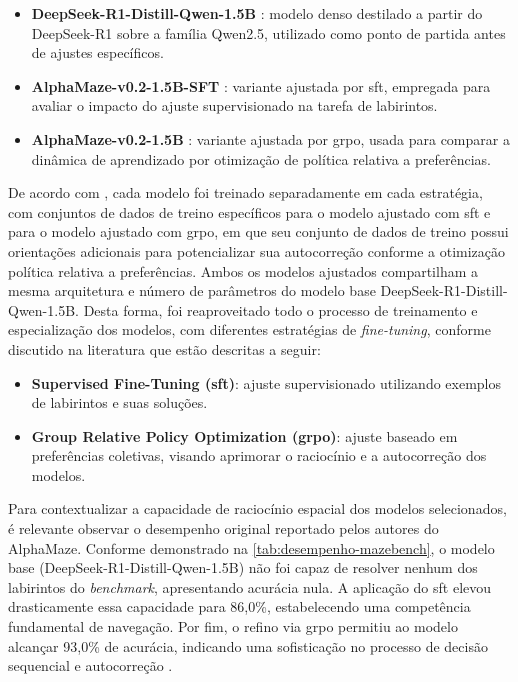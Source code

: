 \begin{itemize}
    \item \textbf{DeepSeek-R1-Distill-Qwen-1.5B} \cite{hf-deepseek-r1-dq-1p5b}: modelo denso destilado a partir do DeepSeek-R1 sobre a família Qwen2.5, utilizado como ponto de partida antes de ajustes específicos.
    \item \textbf{AlphaMaze-v0.2-1.5B-SFT} \cite{hf-jan-alpha-sft-1p5b}: variante ajustada por \gls{sft}, empregada para avaliar o impacto do ajuste supervisionado na tarefa de labirintos.
    \item \textbf{AlphaMaze-v0.2-1.5B} \cite{hf-menlo-alphamaze-v02-1p5b}: variante ajustada por \gls{grpo}, usada para comparar a dinâmica de aprendizado por otimização de política relativa a preferências.
\end{itemize}

De acordo com \citet{dao2025alphamaze}, cada modelo foi treinado separadamente em cada estratégia, com conjuntos de dados de treino específicos para o modelo ajustado com \gls{sft} e para o modelo ajustado com \gls{grpo}, em que seu conjunto de dados de treino possui orientações adicionais para potencializar sua autocorreção conforme a otimização política relativa a preferências. Ambos os modelos ajustados compartilham a mesma arquitetura e número de parâmetros do modelo base DeepSeek-R1-Distill-Qwen-1.5B. Desta forma, foi reaproveitado todo o processo de treinamento e especialização dos modelos, com diferentes estratégias de \textit{fine-tuning}, conforme discutido na literatura que estão descritas a seguir:

\begin{itemize}
    \item \textbf{Supervised Fine-Tuning (\gls{sft})}: ajuste supervisionado utilizando exemplos de labirintos e suas soluções.
    \item \textbf{Group Relative Policy Optimization (\gls{grpo})}: ajuste baseado em preferências coletivas, visando aprimorar o raciocínio e a autocorreção dos modelos.
\end{itemize}

Para contextualizar a capacidade de raciocínio espacial dos modelos selecionados, é relevante observar o desempenho original reportado pelos autores do AlphaMaze. Conforme demonstrado na \autoref{tab:desempenho-mazebench}, o modelo base (DeepSeek-R1-Distill-Qwen-1.5B) não foi capaz de resolver nenhum dos labirintos do \textit{benchmark}, apresentando acurácia nula. A aplicação do \gls{sft} elevou drasticamente essa capacidade para 86,0\%, estabelecendo uma competência fundamental de navegação. Por fim, o refino via \gls{grpo} permitiu ao modelo alcançar 93,0\% de acurácia, indicando uma sofisticação no processo de decisão sequencial e autocorreção \cite{dao2025alphamaze}.

